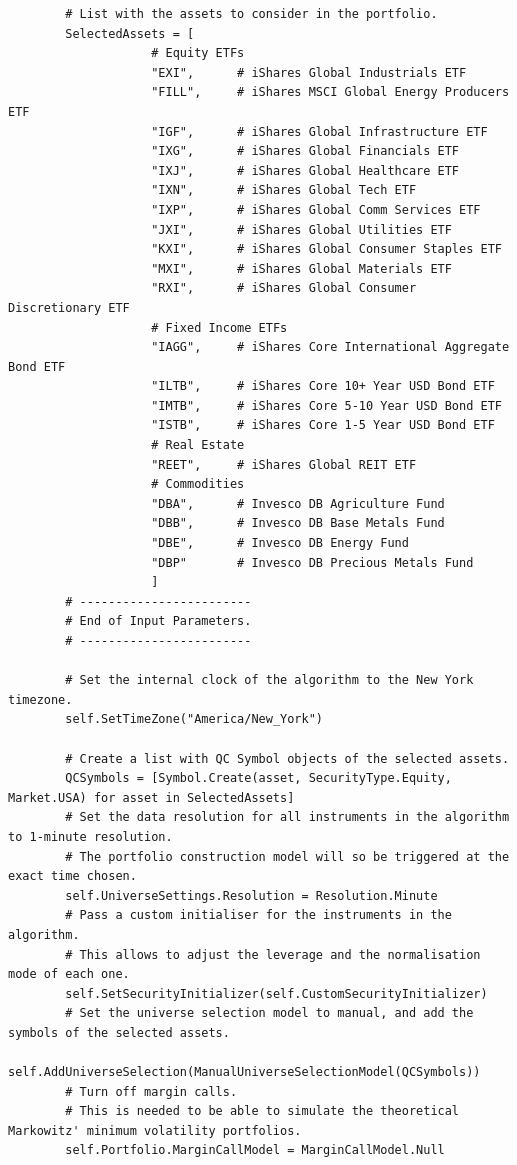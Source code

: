 \begin{verbatim}
        # List with the assets to consider in the portfolio.
        SelectedAssets = [
                    # Equity ETFs
                    "EXI",      # iShares Global Industrials ETF
                    "FILL",     # iShares MSCI Global Energy Producers ETF
                    "IGF",      # iShares Global Infrastructure ETF
                    "IXG",      # iShares Global Financials ETF
                    "IXJ",      # iShares Global Healthcare ETF
                    "IXN",      # iShares Global Tech ETF
                    "IXP",      # iShares Global Comm Services ETF
                    "JXI",      # iShares Global Utilities ETF
                    "KXI",      # iShares Global Consumer Staples ETF
                    "MXI",      # iShares Global Materials ETF
                    "RXI",      # iShares Global Consumer Discretionary ETF
                    # Fixed Income ETFs
                    "IAGG",     # iShares Core International Aggregate Bond ETF
                    "ILTB",     # iShares Core 10+ Year USD Bond ETF
                    "IMTB",     # iShares Core 5-10 Year USD Bond ETF
                    "ISTB",     # iShares Core 1-5 Year USD Bond ETF
                    # Real Estate
                    "REET",     # iShares Global REIT ETF
                    # Commodities
                    "DBA",      # Invesco DB Agriculture Fund
                    "DBB",      # Invesco DB Base Metals Fund
                    "DBE",      # Invesco DB Energy Fund
                    "DBP"       # Invesco DB Precious Metals Fund
                    ]
        # ------------------------
        # End of Input Parameters.
        # ------------------------
        
        # Set the internal clock of the algorithm to the New York timezone.
        self.SetTimeZone("America/New_York")
        
        # Create a list with QC Symbol objects of the selected assets.
        QCSymbols = [Symbol.Create(asset, SecurityType.Equity, Market.USA) for asset in SelectedAssets]
        # Set the data resolution for all instruments in the algorithm to 1-minute resolution.
        # The portfolio construction model will so be triggered at the exact time chosen.
        self.UniverseSettings.Resolution = Resolution.Minute
        # Pass a custom initialiser for the instruments in the algorithm.
        # This allows to adjust the leverage and the normalisation mode of each one.
        self.SetSecurityInitializer(self.CustomSecurityInitializer)
        # Set the universe selection model to manual, and add the symbols of the selected assets.
        self.AddUniverseSelection(ManualUniverseSelectionModel(QCSymbols))
        # Turn off margin calls.
        # This is needed to be able to simulate the theoretical Markowitz' minimum volatility portfolios.
        self.Portfolio.MarginCallModel = MarginCallModel.Null
        

\end{verbatim}
